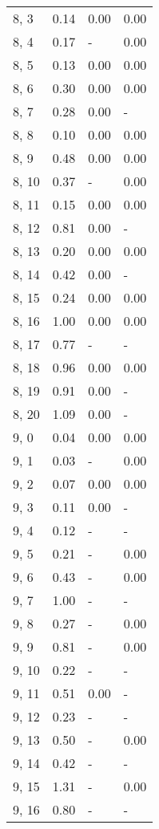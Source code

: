 \begin{table}
\begin{tabular}{llll}
8, 3   &    0.14 &  0.00 &  0.00 \\
8, 4   &    0.17 &     - &  0.00 \\
8, 5   &    0.13 &  0.00 &  0.00 \\
8, 6   &    0.30 &  0.00 &  0.00 \\
8, 7   &    0.28 &  0.00 &     - \\
8, 8   &    0.10 &  0.00 &  0.00 \\
8, 9   &    0.48 &  0.00 &  0.00 \\
8, 10  &    0.37 &     - &  0.00 \\
8, 11  &    0.15 &  0.00 &  0.00 \\
8, 12  &    0.81 &  0.00 &     - \\
8, 13  &    0.20 &  0.00 &  0.00 \\
8, 14  &    0.42 &  0.00 &     - \\
8, 15  &    0.24 &  0.00 &  0.00 \\
8, 16  &    1.00 &  0.00 &  0.00 \\
8, 17  &    0.77 &     - &     - \\
8, 18  &    0.96 &  0.00 &  0.00 \\
8, 19  &    0.91 &  0.00 &     - \\
8, 20  &    1.09 &  0.00 &     - \\
9, 0   &    0.04 &  0.00 &  0.00 \\
9, 1   &    0.03 &     - &  0.00 \\
9, 2   &    0.07 &  0.00 &  0.00 \\
9, 3   &    0.11 &  0.00 &     - \\
9, 4   &    0.12 &     - &     - \\
9, 5   &    0.21 &     - &  0.00 \\
9, 6   &    0.43 &     - &  0.00 \\
9, 7   &    1.00 &     - &     - \\
9, 8   &    0.27 &     - &  0.00 \\
9, 9   &    0.81 &     - &  0.00 \\
9, 10  &    0.22 &     - &     - \\
9, 11  &    0.51 &  0.00 &     - \\
9, 12  &    0.23 &     - &     - \\
9, 13  &    0.50 &     - &  0.00 \\
9, 14  &    0.42 &     - &     - \\
9, 15  &    1.31 &     - &  0.00 \\
9, 16  &    0.80 &     - &     - \\

\end{tabular}
\end{table}
